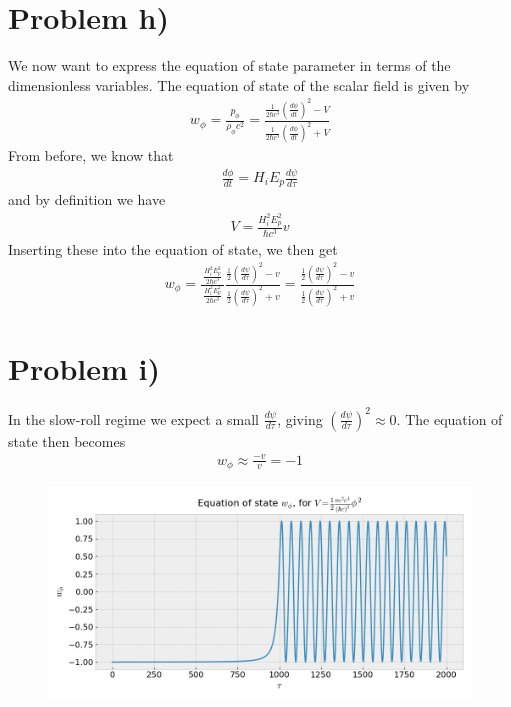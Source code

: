 \documentclass[reprint,english,notitlepage]{revtex4-1}  %
\numberwithin{equation}{section}
\begin{document}
\section{Problem h)}
We now want to express the equation of state parameter in terms of the
dimensionless variables. The equation of state of the scalar field is given by
\begin{align}
 w_\phi =	\frac{p_\phi}{\rho_\phi c^2}
	= \frac{ \frac{1}{2\hbar c^3}\left(\frac{d\phi}{dt}\right)^2 - V }
				 { \frac{1}{2\hbar c^3}\left(\frac{d\phi}{dt}\right)^2 + V }
\end{align}
From before, we know that
\begin{align}
	\frac{d\phi}{dt} = H_i E_p \frac{d\psi}{d\tau}
\end{align}
and by definition we have
\begin{align}
	V = \frac{H_i^2 E_p^2}{\hbar c^3} v
\end{align}
Inserting these into the equation of state, we then get
\begin{align}
	w_\phi
	 = \frac{\ \frac{H_i^2E_p^2}{2\hbar c^3} \ }{\frac{H_i^2E_p^2}{2\hbar c^3}}
	 \frac{ \frac{1}{2}\left(\frac{d\psi}{d\tau}\right)^2 - v }
					{ \frac{1}{2}\left(\frac{d\psi}{d\tau}\right)^2	+ v }
	 = \frac{ \frac{1}{2}\left(\frac{d\psi}{d\tau}\right)^2 - v }
 				 { \frac{1}{2}\left(\frac{d\psi}{d\tau}\right)^2 + v }
\end{align}

\section{Problem i)}
In the slow-roll regime we expect a small $\frac{d\psi}{d\tau}$, giving
$\left(\frac{d\psi}{d\tau}\right)^2 \approx 0$. The equation of state then
becomes
\begin{align}
	w_\phi \approx \frac{-v}{v} = -1
\end{align}

\begin{figure}[h!]
	\includegraphics[width=\linewidth]{QuadraticPotential_field-eos.png}
	\caption{}
	\label{}
\end{figure}
\end{document}
